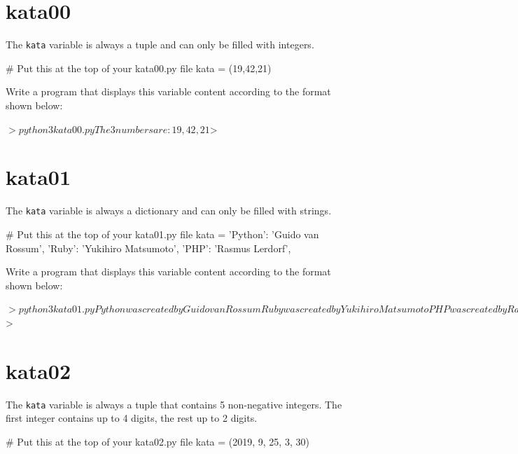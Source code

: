 \documentclass{42-en}
\begin{document}
\section*{kata00}
The \texttt{kata} variable is always a tuple and can only be filled with integers.
\begin{42console}
# Put this at the top of your kata00.py file
kata = (19,42,21)
\end{42console}

Write a program that displays this variable content according to the format shown below:

\begin{42console}
$> python3 kata00.py
The 3 numbers are: 19, 42, 21
$>
\end{42console}

\section*{kata01}

The \texttt{kata} variable is always a dictionary and can only be filled with strings.

\begin{42console}
# Put this at the top of your kata01.py file
kata = {
    'Python': 'Guido van Rossum',
    'Ruby': 'Yukihiro Matsumoto',
    'PHP': 'Rasmus Lerdorf',
    }
\end{42console}

Write a program that displays this variable content according to the format shown below:

\begin{42console}
$> python3 kata01.py
Python was created by Guido van Rossum
Ruby was created by Yukihiro Matsumoto
PHP was created by Rasmus Lerdorf
$>
\end{42console}

\section*{kata02}

The \texttt{kata} variable is always a tuple that contains 5 non-negative integers. The first integer contains up to 4 digits, the rest up to 2 digits.

\begin{42console} 
# Put this at the top of your kata02.py file
kata = (2019, 9, 25, 3, 30)
\end{42console}
\end{document}
